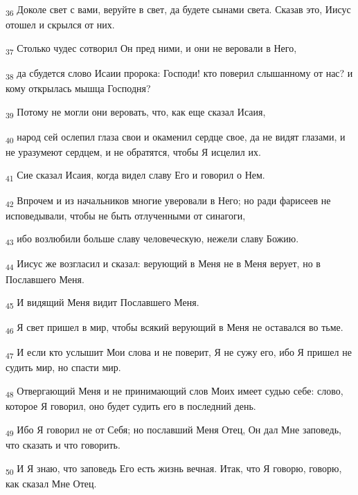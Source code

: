 \begin{tcolorbox}
\textsubscript{36} Доколе свет с вами, веруйте в свет, да будете сынами света. Сказав это, Иисус отошел и скрылся от них.
\end{tcolorbox}
\begin{tcolorbox}
\textsubscript{37} Столько чудес сотворил Он пред ними, и они не веровали в Него,
\end{tcolorbox}
\begin{tcolorbox}
\textsubscript{38} да сбудется слово Исаии пророка: Господи! кто поверил слышанному от нас? и кому открылась мышца Господня?
\end{tcolorbox}
\begin{tcolorbox}
\textsubscript{39} Потому не могли они веровать, что, как еще сказал Исаия,
\end{tcolorbox}
\begin{tcolorbox}
\textsubscript{40} народ сей ослепил глаза свои и окаменил сердце свое, да не видят глазами, и не уразумеют сердцем, и не обратятся, чтобы Я исцелил их.
\end{tcolorbox}
\begin{tcolorbox}
\textsubscript{41} Сие сказал Исаия, когда видел славу Его и говорил о Нем.
\end{tcolorbox}
\begin{tcolorbox}
\textsubscript{42} Впрочем и из начальников многие уверовали в Него; но ради фарисеев не исповедывали, чтобы не быть отлученными от синагоги,
\end{tcolorbox}
\begin{tcolorbox}
\textsubscript{43} ибо возлюбили больше славу человеческую, нежели славу Божию.
\end{tcolorbox}
\begin{tcolorbox}
\textsubscript{44} Иисус же возгласил и сказал: верующий в Меня не в Меня верует, но в Пославшего Меня.
\end{tcolorbox}
\begin{tcolorbox}
\textsubscript{45} И видящий Меня видит Пославшего Меня.
\end{tcolorbox}
\begin{tcolorbox}
\textsubscript{46} Я свет пришел в мир, чтобы всякий верующий в Меня не оставался во тьме.
\end{tcolorbox}
\begin{tcolorbox}
\textsubscript{47} И если кто услышит Мои слова и не поверит, Я не сужу его, ибо Я пришел не судить мир, но спасти мир.
\end{tcolorbox}
\begin{tcolorbox}
\textsubscript{48} Отвергающий Меня и не принимающий слов Моих имеет судью себе: слово, которое Я говорил, оно будет судить его в последний день.
\end{tcolorbox}
\begin{tcolorbox}
\textsubscript{49} Ибо Я говорил не от Себя; но пославший Меня Отец, Он дал Мне заповедь, что сказать и что говорить.
\end{tcolorbox}
\begin{tcolorbox}
\textsubscript{50} И Я знаю, что заповедь Его есть жизнь вечная. Итак, что Я говорю, говорю, как сказал Мне Отец.
\end{tcolorbox}
